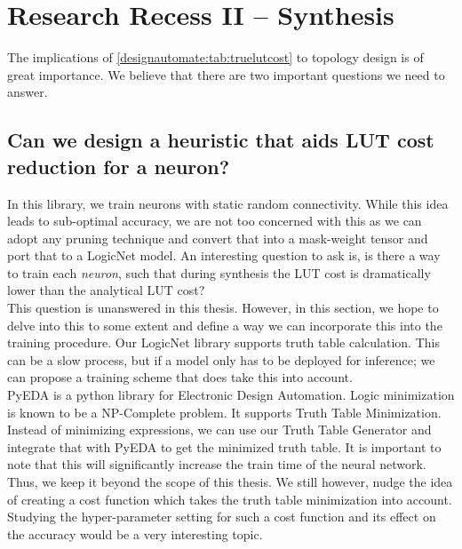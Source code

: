 \clearpage

\clearpage
\section{Research Recess II – Synthesis}

The implications of \cref{designautomate:tab:truelutcost} to topology design is of great importance. We believe that there are two important questions we need to answer.
\subsection{Can we design a heuristic that aids LUT cost reduction for a neuron?}
In this library, we train neurons with static random connectivity. While this idea leads to sub-optimal accuracy, we are not too concerned with this as we can adopt any pruning technique and convert that into a mask-weight tensor and port that to a LogicNet model. An interesting question to ask is, is there a way to train each \textit{neuron}, such that during synthesis the LUT cost is dramatically lower than the analytical LUT cost? \\
This question is unanswered in this thesis. However, in this section, we hope to delve into this to some extent and define a way we can incorporate this into the training procedure. Our LogicNet library supports truth table calculation. This can be a slow process, but if a model only has to be deployed for inference; we can propose a training scheme that does take this into account. \\

PyEDA is a python library for Electronic Design Automation. Logic minimization is known to be a NP-Complete problem. It supports Truth Table Minimization. Instead of minimizing expressions, we can use our Truth Table Generator and integrate that with PyEDA to get the minimized truth table. It is important to note that this will significantly increase the train time of the neural network. Thus, we keep it beyond the scope of this thesis. We still however, nudge the idea of creating a cost function which takes the truth table minimization into account. Studying the hyper-parameter setting for such a cost function and its effect on the accuracy would be a very interesting topic. 

